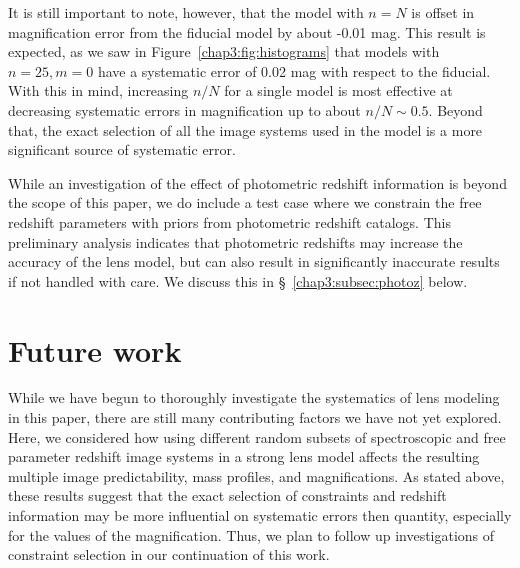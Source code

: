It is still important to note, however, that the model with $n=N$ is offset in magnification error from the fiducial model by about -0.01 mag. This result is expected, as we saw in Figure~\ref{chap3:fig:histograms} that models with $n=25,m=0$ have a systematic error of 0.02 mag with respect to the fiducial. With this in mind, increasing $n/N$ for a single model is most effective at decreasing systematic errors in magnification up to about $n/N\sim0.5$. Beyond that, the exact selection of all the image systems used in the model is a more significant source of systematic error.

While an investigation of the effect of photometric redshift information is beyond the scope of this paper, we do include a test case where we constrain the free redshift parameters with priors from photometric redshift catalogs. This preliminary analysis indicates that photometric redshifts may increase the accuracy of the lens model, but can also result in significantly inaccurate results if not handled with care. We discuss this in \S~\ref{chap3:subsec:photoz} below.

\section{Future work}
\label{chap3:sec:future}
While we have begun to thoroughly investigate the systematics of lens modeling in this paper, there are still many contributing factors we have not yet explored. Here, we considered how using different random subsets of spectroscopic and free parameter redshift image systems in a strong lens model affects the resulting multiple image predictability, mass profiles, and magnifications. As stated above, these results suggest that the exact selection of constraints and redshift information may be more influential on systematic errors then quantity, especially for the values of the magnification. Thus, we plan to follow up investigations of constraint selection in our continuation of this work.

